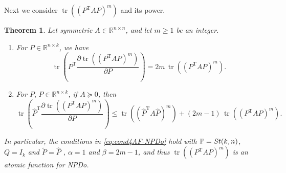 \documentclass[11pt]{article}
\def\bbP{\mathbb{P}}
\def\bbR{\mathbb{R}}
\def\wtd{\widetilde}
\def\what{\widehat}
\newcommand\STM[2]{{\rm St}(#1,#2)}
\DeclareMathOperator{\tr}{tr}
\DeclareMathOperator{\T}{T}
\newtheorem{theorem}{Theorem}[section]
\theoremstyle{definition}
\numberwithin{equation}{section}
\begin{document}
Next we consider $\tr((P^{\T}AP)^m)$ and its power.

\begin{theorem}\label{thm:quad4tr-diff-eq}
Let symmetric $A\in\bbR^{n\times n}$, and let $m\ge 1$ be an integer.
\begin{enumerate}[{\rm (a)}]
  \item For $P\in\bbR^{n\times k}$, we have
\begin{equation}\label{eq:quad-pow4tr-diff-eq}
\tr\left(P^{\T}\frac{\partial \tr((P^{\T}AP)^m)}{\partial P}\right)=2m\, \tr((P^{\T}AP)^m).
\end{equation}
  \item For $P,\,\what P\in\bbR^{n\times k}$, if $A\succeq 0$, then
        \begin{equation}\label{eq:regularity4quad-pow4tr-diff-eq}
        \tr\left(\what P^{\T}\frac{\partial \tr((P^{\T}AP)^m)}{\partial P}\right)\le\tr((\what P^{\T}A\what P)^m)+(2m-1)\,\tr((P^{\T}AP)^m).        \end{equation}
\end{enumerate}
In particular, the conditions in \eqref{eq:cond4AF-NPDo} hold with $\bbP=\STM{k}{n}$, $Q=I_k$ and
$\wtd P=\what P$ , $\alpha=1$ and $\beta=2m-1$,
and thus $\tr((P^{\T}AP)^m)$ is an atomic function for NPDo.
\end{theorem}
\end{document}
